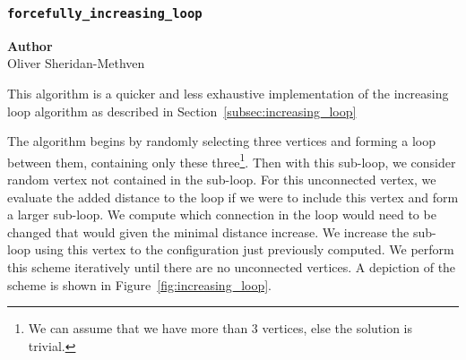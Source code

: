 \subsubsection{\texttt{forcefully\_increasing\_loop}}
\label{subsubsec:forcefully_increasing_loops}

\begin{flushright}
\textbf{Author} \\
Oliver Sheridan-Methven
\end{flushright}

This algorithm is a quicker and less exhaustive implementation of the increasing loop algorithm as described in Section~\ref{subsec:increasing_loop}

The algorithm begins by randomly selecting three vertices and forming a loop between them, containing only these three\footnote{We can assume that we have more than 3 vertices, else the solution is trivial.}. Then with this sub-loop, we consider random vertex not contained in the sub-loop. For this unconnected vertex, we evaluate the added distance to the loop if we were to include this vertex and form a larger sub-loop. We compute which connection in the loop would need to be changed that would given the minimal distance increase. We increase the sub-loop using this vertex to the configuration just previously computed. We perform this scheme iteratively until there are no unconnected vertices. A depiction of the scheme is shown in Figure~\ref{fig:increasing_loop}.


